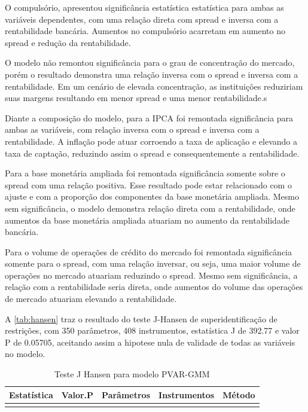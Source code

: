 \documentclass[
  12pt,
  12pt,
  openright,
  oneside,
  a4paper,
  chapter=TITLE,
  section=TITLE,
  subsection=TITLE,
  subsubsection=TITLE,
  english,
  portugues,
  sumario=tradicional]{abntex2}
\begin{document}
O compulsório, apresentou significância estatística estatística para ambas as variáveis dependentes, com uma relação direta com spread e inversa com a rentabilidade bancária. Aumentos no compulsório acarretam em aumento no spread e redução da rentabilidade.

O modelo não remontou significância para o grau de concentração do mercado, porém o resultado demonstra uma relação inversa com o spread e inversa com a rentabilidade. Em um cenário de elevada concentração, as instituições reduziriam suas margens resultando em menor spread e uma menor rentabilidade.s

Diante a composição do modelo, para a IPCA foi remontada significância para ambas as variáveis, com relação inversa com o spread e inversa com a rentabilidade. A inflação pode atuar corroendo a taxa de aplicação e elevando a taxa de captação, reduzindo assim o spread e consequentemente a rentabilidade.

Para a base monetária ampliada foi remontada significância somente sobre o spread com uma relação positiva. Esse resultado pode estar relacionado com o ajuste e com a proporção dos componentes da base monetária ampliada. Mesmo sem significância, o modelo demonstra relação direta com a rentabilidade, onde aumentos da base monetária ampliada atuariam no aumento da rentabilidade bancária.

Para o volume de operações de crédito do mercado foi remontada significância somente para o spread, com uma relação inversar, ou seja, uma maior volume de operações no mercado atuariam reduzindo o spread. Mesmo sem significância, a relação com a rentabilidade seria direta, onde aumentos do volume das operações de mercado atuariam elevando a rentabilidade.

A \autoref{tab:hansen} traz o resultado do teste J-Hansen de superidentificação de restrições, com 350 parâmetros, 408 instrumentos, estatística J de 392.77 e valor P de 0.05705, aceitando assim a hipotese nula de validade de todas as variáveis no modelo.

\begin{table}[!hbtp]
\caption{Teste J Hansen para modelo PVAR-GMM}
\vspace{-1mm}

\begin{tabu} to 
\toprule
Estatística & Valor.P & Parâmetros & Instrumentos & Método\\
\midrule
{} &  &  &  & \\
\bottomrule
\end{tabu}
\vspace{1mm}
\label{tab:hansen}
\vspace{-2mm}
\end{table}
\end{document}
